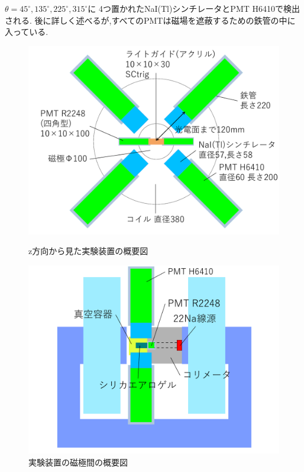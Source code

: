 $\theta=45^{\circ},135^{\circ},225^{\circ},315^{\circ}$に
4つ置かれたNaI(Tl)シンチレータとPMT H6410で検出される.
後に詳しく述べるが,すべてのPMTは磁場を遮蔽するための鉄管の中に入っている.


\begin{figure}[H]
\begin{minipage}{0.5\hsize}
\centering
\includegraphics[keepaspectratio,scale=0.3]{fig/ybm/device2.pdf}
\caption{z方向から見た実験装置の概要図}
\label{fig:device2}
\end{minipage}
\begin{minipage}{0.5\hsize}
\centering
\includegraphics[keepaspectratio,scale=0.3]{fig/ybm/device3.pdf}
\caption{実験装置の磁極間の概要図}
\label{fig:device3}
\end{minipage}
\end{figure}

